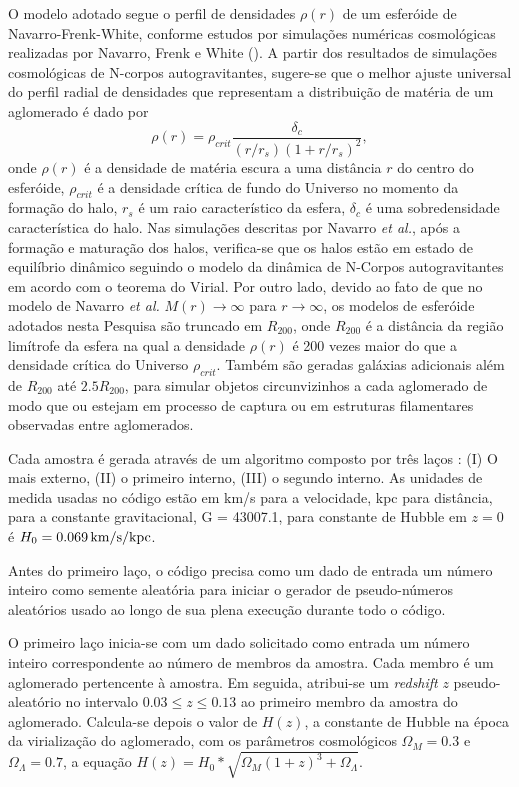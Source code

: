 \documentclass[a4paper]{report}
\begin{document}
O modelo adotado segue o perfil de densidades $\rho(r)$ de um esfer\'oide de Navarro-Frenk-White, conforme estudos por simula\c c\~oes num\'ericas cosmol\'ogicas realizadas por Navarro, Frenk e White (\cite{NFW1997}). A partir dos resultados de simula\c c\~oes cosmol\'ogicas de N-corpos autogravitantes, sugere-se que o melhor ajuste universal do perfil radial de densidades que representam a distribui\c c\~ao de mat\'eria de um aglomerado \'e dado por
\begin{equation}
\rho(r)=\rho_{crit}\frac{\delta_c}{(r/r_s)(1 + r/r_s)^2},
\label{nfw1}
\end{equation}
onde $\rho(r)$ \'e a densidade de mat\'eria escura a uma dist\^ancia $r$ do centro do esfer\'oide, $\rho_{crit}$ \'e a densidade cr\'itica de fundo do Universo no momento da forma\c c\~ao do halo, $r_s$ \'e um raio caracter\'istico da esfera, $\delta_c$ \'e uma sobredensidade caracter\'istica do halo. Nas simula\c c\~oes descritas por Navarro {\it et al.}, ap\'os a forma\c c\~ao e matura\c c\~ao dos halos, verifica-se que os halos est\~ao em estado de equil\'ibrio din\^amico seguindo o modelo da din\^amica de N-Corpos autogravitantes em acordo com o teorema do Virial. Por outro lado, devido ao fato de que no modelo de Navarro {\it et al.} $M(r) \to \infty$ para $r \to \infty$, os modelos de esfer\'oide adotados nesta Pesquisa s\~ao truncado em $R_{200}$, onde $R_{200}$ \'e a dist\^ancia da regi\~ao lim\'itrofe da esfera na qual a densidade $\rho(r)$ \'e 200 vezes maior do que a densidade cr\'itica do Universo $\rho_{crit}$. Tamb\'em s\~ao geradas gal\'axias adicionais al\'em de $R_{200}$ at\'e $2.5 R_{200}$, para simular objetos circunvizinhos a cada aglomerado de modo que ou estejam em processo de captura ou em estruturas filamentares observadas entre aglomerados.

\par Cada amostra \'e gerada atrav\'es de um algoritmo composto por tr\^es la\c cos : (I) O mais externo, (II) o primeiro interno, (III) o segundo interno. As unidades de medida usadas no c\'odigo est\~ao em km/s para a velocidade, kpc para dist\^ancia, para a constante gravitacional, G = 43007.1, para constante de Hubble em $z=0$ \'e $H_0 = 0.069 \, {\rm km/s/kpc}$.
\par Antes do primeiro la\c co, o c\'odigo precisa como um dado de entrada um n\'umero inteiro como semente aleat\'oria para iniciar o gerador de pseudo-n\'umeros aleat\'orios usado ao longo de sua plena execu\c c\~ao durante todo o c\'odigo. 
\par O primeiro la\c co inicia-se com um dado solicitado como entrada um n\'umero inteiro correspondente ao n\'umero de membros da amostra. Cada membro \'e um aglomerado pertencente \`a amostra. Em seguida, atribui-se um \textit{redshift} $z$ pseudo-aleat\'orio no intervalo $0.03 \leq z \leq 0.13$ ao primeiro membro da amostra do aglomerado. Calcula-se depois o valor de $H(z)$, a constante de Hubble na \'epoca da virializa\c c\~ao do aglomerado, com os par\^ametros cosmol\'ogicos $\Omega_M = 0.3$ e $\Omega_{\Lambda}=0.7$, a equa\c c\~ao $H(z) = H_0*\sqrt{\Omega_M(1+z)^3 + \Omega_{\Lambda}}$.
\end{document}
